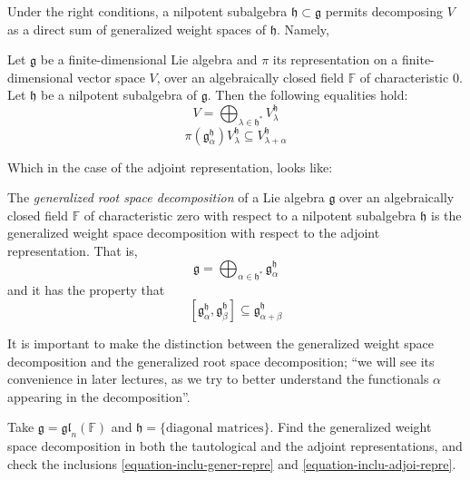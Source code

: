 Under the right conditions, a nilpotent
subalgebra
$\mathfrak{h} \subset \mathfrak{g}$ permits
decomposing $V$ as a direct sum of
generalized weight
spaces of $\mathfrak{h}$. Namely,

\begin{theorem}
\label{theorem-decom-into-gener-weigh-spac}
Let $\mathfrak{g}$ be a finite-dimensional
Lie algebra
and $\pi$ its representation on a
finite-dimensional vector
space $V$, over an algebraically closed field
$\mathbb{F}$ of characteristic 0.
Let $\mathfrak{h}$ be a nilpotent subalgebra
of $\mathfrak{g}$.
Then the following equalities hold:
$$
V=\bigoplus_{\lambda \in
\mathfrak{h}^*}V_\lambda^\mathfrak{h}
$$
\begin{equation}
\label{equation-inclu-gener-repre}
\pi\left(\mathfrak{g}^\mathfrak{h}
_\alpha\right)V_\lambda^\mathfrak{h}
\subseteq V_{\lambda+\alpha}^\mathfrak{h}
\end{equation}
\end{theorem}

Which in the case of the adjoint
representation, looks like:

\begin{definition}
\label{definition-gener-root-space-decom}
The {\it generalized root space
decomposition} of a Lie algebra
$\mathfrak{g}$ over an algebraically closed
field $\mathbb{F}$
of characteristic zero with respect to a
nilpotent subalgebra $\mathfrak{h}$
is the generalized weight space decomposition
with respect to the
adjoint representation. That is,
$$
\mathfrak{g}=\bigoplus_{\alpha \in
\mathfrak{h}^*}
\mathfrak{g}_\alpha^\mathfrak{h}
$$
and it has the property that
\begin{equation}
\label{equation-inclu-adjoi-repre}
[\mathfrak{g}_\alpha^\mathfrak{h},
\mathfrak{g}_\beta^\mathfrak{h}]
\subseteq\mathfrak{g}_{\alpha+\beta}
^\mathfrak{h}
\end{equation}
\end{definition}

It is important to make the distinction
between the generalized weight
space decomposition and the generalized root
space decomposition;
``we will see its convenience in later
lectures, as
we try to better understand the functionals
$\alpha$ appearing
in the decomposition''.

\begin{exercise}
\label{exercise-gener-weigh-space-decom}
Take
$\mathfrak{g}=\mathfrak{gl}_n(\mathbb{F})$
and
$\mathfrak{h}=\{\text{diagonal matrices}\}$.
Find the generalized weight space
decomposition in both the
tautological and the adjoint representations,
and check the inclusions
\ref{equation-inclu-gener-repre} and
\ref{equation-inclu-adjoi-repre}.
\end{exercise}

